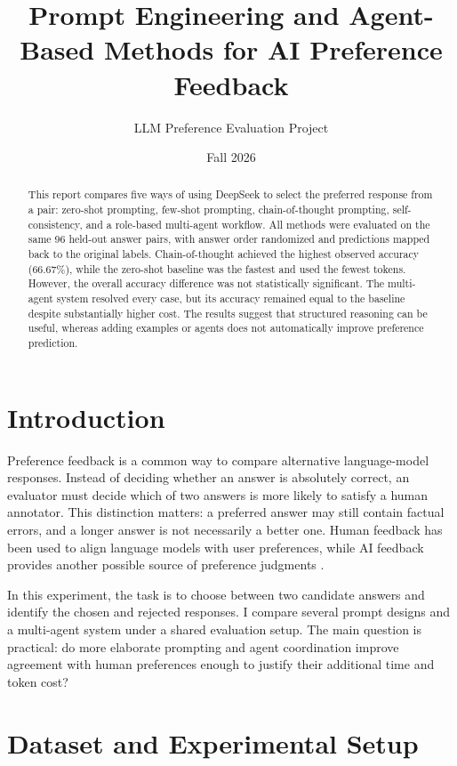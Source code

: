 \documentclass[10pt]{article}
\title{Prompt Engineering and Agent-Based Methods for AI Preference Feedback}
\author{LLM Preference Evaluation Project}
\date{Fall 2026}
\begin{document}
\maketitle
\vspace{-1.5em}

\begin{abstract}
This report compares five ways of using DeepSeek to select the preferred response from a pair: zero-shot prompting, few-shot prompting, chain-of-thought prompting, self-consistency, and a role-based multi-agent workflow. All methods were evaluated on the same 96 held-out answer pairs, with answer order randomized and predictions mapped back to the original labels. Chain-of-thought achieved the highest observed accuracy (66.67\%), while the zero-shot baseline was the fastest and used the fewest tokens. However, the overall accuracy difference was not statistically significant. The multi-agent system resolved every case, but its accuracy remained equal to the baseline despite substantially higher cost. The results suggest that structured reasoning can be useful, whereas adding examples or agents does not automatically improve preference prediction.
\end{abstract}

\section{Introduction}
Preference feedback is a common way to compare alternative language-model responses. Instead of deciding whether an answer is absolutely correct, an evaluator must decide which of two answers is more likely to satisfy a human annotator. This distinction matters: a preferred answer may still contain factual errors, and a longer answer is not necessarily a better one. Human feedback has been used to align language models with user preferences, while AI feedback provides another possible source of preference judgments \cite{ouyang2022,bai2022}.

In this experiment, the task is to choose between two candidate answers and identify the chosen and rejected responses. I compare several prompt designs and a multi-agent system under a shared evaluation setup. The main question is practical: do more elaborate prompting and agent coordination improve agreement with human preferences enough to justify their additional time and token cost?

\section{Dataset and Experimental Setup}
\end{document}
